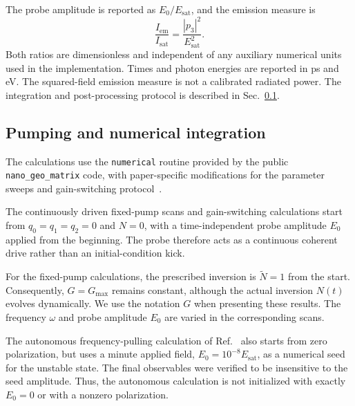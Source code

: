 \documentclass{optica-article}
\begin{document}
The probe amplitude is reported as $E_0/E_{\mathrm{sat}}$, and the emission measure is
\begin{equation}
\frac{I_{\mathrm{em}}}{I_{\mathrm{sat}}}
=\frac{|p_3|^2}{E_{\mathrm{sat}}^2}.
\end{equation}
Both ratios are dimensionless and independent of any auxiliary numerical units used in the implementation. Times and photon energies are reported in ps and eV. The squared-field emission measure is not a calibrated radiated power. The integration and post-processing protocol is described in Sec.~\ref{sec:numerical_protocol}.

\subsection{Pumping and numerical integration}
\label{sec:numerical_protocol}

The calculations use the \texttt{numerical} routine provided by the public \texttt{nano\_geo\_matrix} code, with paper-specific modifications for the parameter sweeps and gain-switching protocol~\cite{NanoGeoMatrix:2026}.

The continuously driven fixed-pump scans and gain-switching calculations start from $q_0=q_1=q_2=0$ and $N=0$, with a time-independent probe amplitude $E_0$ applied from the beginning. The probe therefore acts as a continuous coherent drive rather than an initial-condition kick.


For the fixed-pump calculations, the prescribed inversion is $\widetilde N=1$ from the start. Consequently, $G=G_{\max}$ remains constant, although the actual inversion $N(t)$ evolves dynamically. We use the notation $G$ when presenting these results. The frequency $\omega$ and probe amplitude $E_0$ are varied in the corresponding scans.

The autonomous frequency-pulling calculation of Ref.~\cite{Aradian:2024} also starts from zero polarization, but uses a minute applied field, $E_0=10^{-8}E_{\mathrm{sat}}$, as a numerical seed for the unstable state. The final observables were verified to be insensitive to the seed amplitude. Thus, the autonomous calculation is not initialized with exactly $E_0=0$ or with a nonzero polarization.
\end{document}
